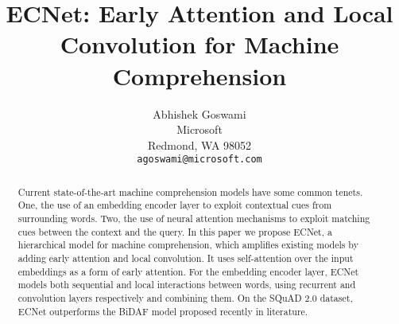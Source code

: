 \documentclass{article}
\title{ECNet: Early Attention and Local Convolution for Machine Comprehension}
\author{%
	Abhishek Goswami\\
  Microsoft\\
  Redmond, WA 98052 \\
  \texttt{agoswami@microsoft.com} \\
}
\begin{document}

\maketitle

\begin{abstract}

Current state-of-the-art machine comprehension models have some common tenets. One, the use of an embedding encoder layer to exploit contextual cues from surrounding words. Two, the use of neural attention mechanisms to exploit matching cues between the context and the query. In this paper we propose ECNet, a hierarchical model for machine comprehension, which amplifies existing models by adding early attention and local convolution. It uses self-attention over the input embeddings as a form of early attention. For the embedding encoder layer, ECNet models both sequential and local interactions between words, using recurrent and convolution layers respectively and combining them.  On the SQuAD 2.0 dataset, ECNet outperforms the BiDAF model proposed recently in literature.

\end{abstract}






%
%
%
%



\end{document}
